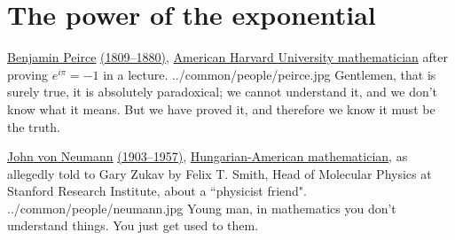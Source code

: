 \section{The power of the exponential}
\qboxnps
  { \href{http://www-history.mcs.st-andrews.ac.uk/Biographies/Peirce_Benjamin.html}{Benjamin Peirce}
    \href{http://www-history.mcs.st-andrews.ac.uk/Timelines/TimelineF.html}{(1809--1880)},
    \href{http://www-history.mcs.st-andrews.ac.uk/BirthplaceMaps/Places/USA.html}{American Harvard University mathematician}
    after proving $e^{i\pi}=-1$ in a lecture.
    \footnotemark
  }
  {../common/people/peirce.jpg}
  {Gentlemen, that is surely true, it is absolutely paradoxical;
   we cannot understand it, and we don't know what it means.
   But we have proved it, and therefore we know it must be the truth.}

\qboxnps
  { \href{http://en.wikipedia.org/wiki/John_von_Neumann}{John von Neumann}
    \href{http://www-history.mcs.st-andrews.ac.uk/Timelines/TimelineG.html}{(1903--1957)},
    \href{http://www-history.mcs.st-andrews.ac.uk/BirthplaceMaps/Places/Russia.html}{Hungarian-American mathematician},
    as allegedly told to Gary Zukav by Felix T. Smith, Head of Molecular Physics at Stanford Research Institute,
    about a ``physicist friend".
    \footnotemark
  }
  {../common/people/neumann.jpg}
  {Young man, in mathematics you don't understand things. You just get used to them.}



